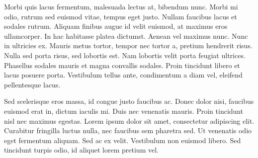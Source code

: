 Morbi quis lacus fermentum, malesuada lectus at, bibendum nunc. Morbi mi odio, rutrum sed euismod vitae, tempus eget justo. Nullam faucibus lacus et sodales rutrum. Aliquam finibus augue id velit euismod, at maximus eros ullamcorper. In hac habitasse platea dictumst. Aenean vel maximus nunc. Nunc in ultricies ex. Mauris metus tortor, tempor nec tortor a, pretium hendrerit risus. Nulla sed porta risus, sed lobortis est. Nam lobortis velit porta feugiat ultrices. Phasellus sodales mauris et magna convallis sodales. Proin tincidunt libero et lacus posuere porta. Vestibulum tellus ante, condimentum a diam vel, eleifend pellentesque lacus.

Sed scelerisque eros massa, id congue justo faucibus ac. Donec dolor nisi, faucibus euismod erat in, dictum iaculis mi. Duis nec venenatis mauris. Proin tincidunt nisl nec maximus egestas. Lorem ipsum dolor sit amet, consectetur adipiscing elit. Curabitur fringilla luctus nulla, nec faucibus sem pharetra sed. Ut venenatis odio eget fermentum aliquam. Sed ac ex velit. Vestibulum non euismod libero. Sed tincidunt turpis odio, id aliquet lorem pretium vel. 


\newpage


